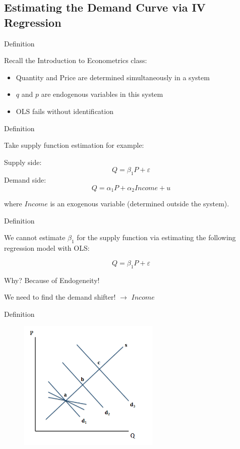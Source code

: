\documentclass[11pt]{beamer}
\begin{document}
\subsection{Estimating the Demand Curve via IV Regression}

\begin{frame}[fragile]{Definition}

Recall the Introduction to Econometrics class:
	\begin{itemize}
		\item Quantity and Price are determined simultaneously in a system
		\item $q$ and $p$ are endogenous variables in this system
		\item OLS fails without identification
	\end{itemize}

\end{frame}


\begin{frame}[fragile]{Definition}

Take supply function estimation for example:

Supply side:
$$Q=\beta_1 P+\varepsilon$$
Demand side:
$$Q=\alpha_1 P+\alpha_2Income+u$$

where $Income$ is an exogenous variable (determined outside the system).

\end{frame}


\begin{frame}[fragile]{Definition}

We cannot estimate $\beta_1$ for the supply function via estimating the following regression model with OLS:

$$Q=\beta_1 P+\varepsilon$$

Why? Because of Endogeneity!

We need to find the demand shifter! $\rightarrow$ $Income$

\end{frame}


\begin{frame}[fragile]{Definition}

	\begin{figure}
		\begin{center}
			\includegraphics[width=0.6\textwidth]{figure/f06.png}
		\end{center}
	\end{figure}

\end{frame}
\end{document}

